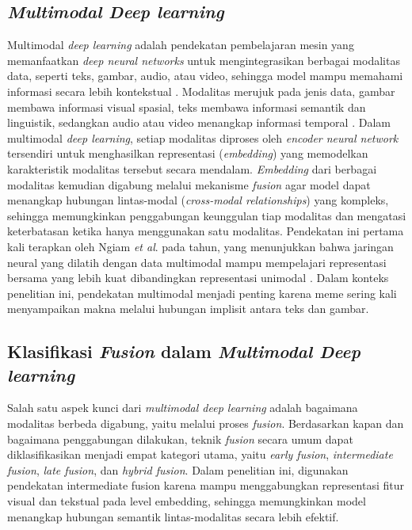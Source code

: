 \subsection{\textit{Multimodal Deep learning}} \label{II.teori7}
Multimodal \textit{deep learning} adalah pendekatan pembelajaran mesin yang memanfaatkan \textit{deep neural networks} untuk mengintegrasikan berbagai modalitas data, seperti teks, gambar, audio, atau video, sehingga model mampu memahami informasi secara lebih kontekstual \cite{ngiam2011multimodal}. Modalitas merujuk pada jenis data, gambar membawa informasi visual spasial, teks membawa informasi semantik dan linguistik, sedangkan audio atau video menangkap informasi temporal \cite{IBM2024multimodal}. Dalam multimodal \textit{deep learning}, setiap modalitas diproses oleh \textit{encoder neural network} tersendiri untuk menghasilkan representasi (\textit{embedding}) yang memodelkan karakteristik modalitas tersebut secara mendalam. \textit{Embedding} dari berbagai modalitas kemudian digabung melalui mekanisme \textit{fusion} agar model dapat menangkap hubungan lintas-modal (\textit{cross-modal relationships}) yang kompleks, sehingga memungkinkan penggabungan keunggulan tiap modalitas dan mengatasi keterbatasan ketika hanya menggunakan satu modalitas. Pendekatan ini pertama kali terapkan oleh Ngiam \textit{et al}. pada tahun, yang menunjukkan bahwa jaringan neural yang dilatih dengan data multimodal mampu mempelajari representasi bersama yang lebih kuat dibandingkan representasi unimodal \cite{ngiam2011multimodal}. Dalam konteks penelitian ini, pendekatan multimodal menjadi penting karena meme sering kali menyampaikan makna melalui hubungan implisit antara teks dan gambar.


\subsection{Klasifikasi \textit{Fusion} dalam \textit{Multimodal Deep learning}} \label{II.teori8}
Salah satu aspek kunci dari \textit{multimodal deep learning} adalah bagaimana modalitas berbeda digabung, yaitu melalui proses \textit{fusion}. Berdasarkan kapan dan bagaimana penggabungan dilakukan, teknik \textit{fusion} secara umum dapat diklasifikasikan menjadi empat kategori utama, yaitu \textit{early fusion}, \textit{intermediate fusion}, \textit{late fusion}, dan \textit{hybrid fusion}. Dalam penelitian ini, digunakan pendekatan intermediate fusion karena mampu menggabungkan representasi fitur visual dan tekstual pada level embedding, sehingga memungkinkan model menangkap hubungan semantik lintas-modalitas secara lebih efektif.

